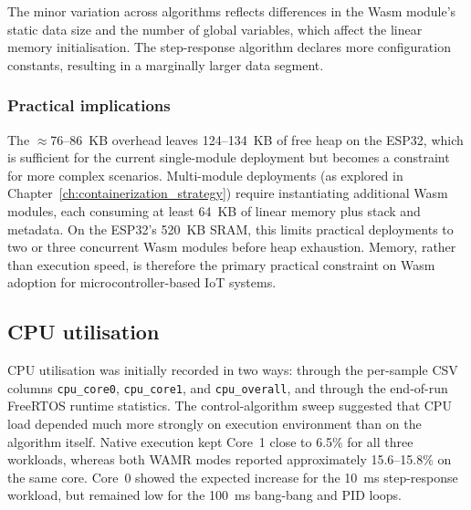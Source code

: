 \documentclass[12pt, a4paper]{report}
\begin{document}
The minor variation across algorithms reflects differences in the Wasm module's static data size and the number of global variables, which affect the linear memory initialisation. The step-response algorithm declares more configuration constants, resulting in a marginally larger data segment.

\subsubsection{Practical implications}
\label{subsec:memory-implications}

The $\approx$76--86~KB overhead leaves 124--134~KB of free heap on the ESP32, which is sufficient for the current single-module deployment but becomes a constraint for more complex scenarios. Multi-module deployments (as explored in Chapter~\ref{ch:containerization_strategy}) require instantiating additional Wasm modules, each consuming at least 64~KB of linear memory plus stack and metadata. On the ESP32's 520~KB SRAM, this limits practical deployments to two or three concurrent Wasm modules before heap exhaustion. Memory, rather than execution speed, is therefore the primary practical constraint on Wasm adoption for microcontroller-based IoT systems.

\subsection{CPU utilisation}
\label{sec:cpu-utilisation}

CPU utilisation was initially recorded in two ways: through the per-sample CSV columns
\texttt{cpu\_core0}, \texttt{cpu\_core1}, and \texttt{cpu\_overall}, and through the end-of-run
FreeRTOS runtime statistics. The control-algorithm sweep suggested that CPU load depended much
more strongly on execution environment than on the algorithm itself. Native execution kept
Core~1 close to 6.5\% for all three workloads, whereas both WAMR modes reported approximately
15.6--15.8\% on the same core. Core~0 showed the expected increase for the 10~ms step-response
workload, but remained low for the 100~ms bang-bang and PID loops.
\end{document}
